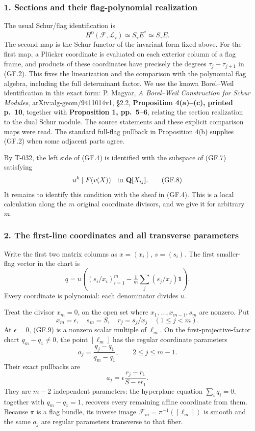 \documentclass[
  10pt,
]{article}
\begin{document}
\subsubsection{1. Sections and their flag-polynomial
realization}\label{sections-and-their-flag-polynomial-realization}

The usual Schur/flag identification is \[
H^0(\mathcal F,\mathcal L_\tau)\simeq S_\tau E^*
\simeq S_\tau E.
\tag{GF.7}
\] The second map is the Schur functor of the invariant form fixed
above. For the first map, a Plücker coordinate is evaluated on each
exterior column of a flag frame, and products of these coordinates have
precisely the degrees \(\tau_j-\tau_{j+1}\) in (GF.2). This fixes the
linearization and the comparison with the polynomial flag algebra,
including the full determinant factor. We use the known Borel--Weil
identification in this exact form: P. Magyar, \emph{A Borel--Weil
Construction for Schur Modules}, arXiv:alg-geom/9411014v1, §2.2,
\textbf{Proposition 4(a)--(c), printed p.~10}, together with
\textbf{Proposition 1, pp.~5--6}, relating the section realization to
the dual Schur module. The source statements and these explicit
comparison maps were read. The standard full-flag pullback in
Proposition 4(b) supplies (GF.2) when some adjacent parts agree.

By T-032, the left side of (GF.4) is identified with the subspace of
(GF.7) satisfying \[
u^k\mid F(v(X))\quad\hbox{in }\mathbf Q[X_{ij}].
\tag{GF.8}
\] It remains to identify this condition with the sheaf in (GF.4). This
is a local calculation along the \(m\) original coordinate divisors, and
we give it for arbitrary \(m\).

\subsubsection{2. The first-line coordinates and all transverse
parameters}\label{the-first-line-coordinates-and-all-transverse-parameters}

Write the first two matrix columns as \(x=(x_i)\), \(s=(s_i)\). The
first smaller-flag vector in the chart is \[
q=u\left((s_i/x_i)_{i=1}^m
-\tfrac1m\sum_j(s_j/x_j)\mathbf1\right).
\tag{GF.9}
\] Every coordinate is polynomial: each denominator divides \(u\).

Treat the divisor \(x_m=0\), on the open set where
\(x_1,\ldots,x_{m-1},s_m\) are nonzero. Put \[
x_m=\epsilon,\quad s_m=S,\quad r_j=s_j/x_j\quad(1\le j<m).
\] At \(\epsilon=0\), (GF.9) is a nonzero scalar multiple of \(\ell_m\).
On the first-projective-factor chart \(q_m-q_1\ne0\), the point
\([\ell_m]\) has the regular coordinate parameters \[
a_j=\frac{q_j-q_1}{q_m-q_1},\qquad2\le j\le m-1.
\] Their exact pullbacks are \[
\boxed{a_j=\epsilon\frac{r_j-r_1}{S-\epsilon r_1}.}
\tag{GF.10}
\] They are \(m-2\) independent parameters: the hyperplane equation
\(\sum_iq_i=0\), together with \(q_m-q_1=1\), recovers every remaining
affine coordinate from them. Because \(\pi\) is a flag bundle, its
inverse image \(\mathcal F_m=\pi^{-1}([\ell_m])\) is smooth and the same
\(a_j\) are regular parameters transverse to that fiber.
\end{document}
